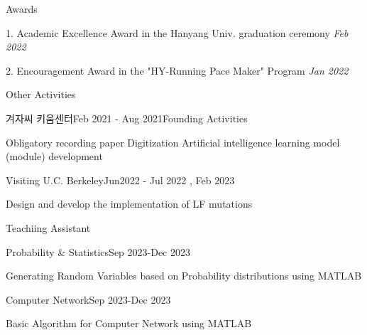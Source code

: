 \documentclass[
	11pt, %
]{resume} %
\begin{document}
\begin{rSection}{Awards}

	1. Academic Excellence Award in the Hanyang Univ. graduation ceremony \hfill \textit {Feb 2022}

	2. Encouragement Award in the "HY-Running Pace Maker" Program \hfill \textit {Jan 2022}

\end{rSection}

\begin{rSection}{Other Activities}

	\begin{rSubsection}{겨자씨 키움센터}{Feb 2021 - Aug 2021}{Founding Activities}{}
		\item Obligatory recording paper Digitization Artiﬁcial intelligence learning model (module) development
	\end{rSubsection}

	\begin{rSubsection}{Visiting U.C. Berkeley}{Jun2022 - Jul 2022 , Feb 2023}{}{}
		\item Design and develop the implementation of LF mutations
	\end{rSubsection}

\end{rSection}

\begin{rSection}{Teachiing Assistant}

	\begin{rSubsection}{Probability \& Statistics}{Sep 2023-Dec 2023}{}{}
		\item Generating Random Variables based on Probability distributions using MATLAB
	\end{rSubsection}

	\begin{rSubsection}{Computer Network}{Sep 2023-Dec 2023}{}{}
		\item Basic Algorithm for Computer Network using MATLAB
	\end{rSubsection}

\end{rSection}

\end{document}
